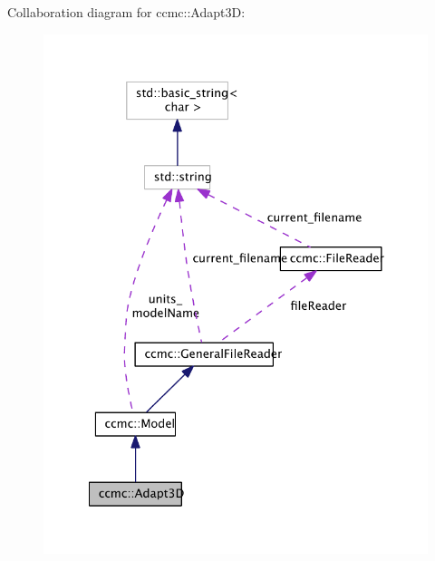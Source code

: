 Collaboration diagram for ccmc\-:\-:Adapt3\-D\-:\nopagebreak
\begin{figure}[H]
\begin{center}
\leavevmode
\includegraphics[width=330pt]{classccmc_1_1_adapt3_d__coll__graph}
\end{center}
\end{figure}

